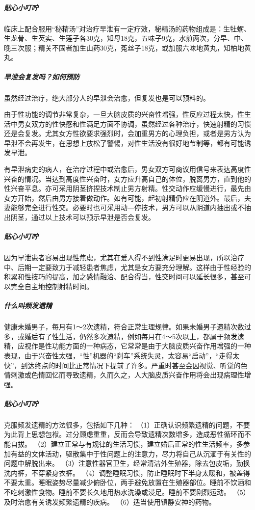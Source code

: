 \subparagraph{贴心小叮咛}

临床上配合服用“秘精汤”对治疗早泄有一定疗效，秘精汤的药物组成是：生牡蛎、生龙骨、生芡实、生莲子各30克，知母18克，五味子9克，水煎两次，分早、中、晚三次服；精关不固者加生山药30克，菟丝子18克，或加服六味地黄丸，知柏地黄丸。

\subparagraph{早泄会复发吗？如何预防}

虽然经过治疗，绝大部分人的早泄会治愈，但复发也是可以预料的。

由于性功能的调节非常复杂，一旦大脑皮质的兴奋性增强，性反应过程太快，性生活中男女双方的性快感和性满足方面不协调，虽然经过各种治疗，快速射精的习惯还是会复发。尤其女方性欲要求强烈时，会加重男方的心理负担，或者是男方认为早泄不会再发生，在思想上放松了警惕，对性生活没有很好地节制等，都有可能诱发早泄。

有早泄病史的病人，在治疗过程中或治愈后，男女双方可商议用信号来表达高度性兴奋的情况。当达到高度性兴奋时，女方应升高自己的体位，脱离男方，直到他的性兴奋平息。亦可采用阴茎挤捏技术制止男方射精。性交动作应缓慢进行，最先由女方开始，然后由男方接着做动作。如有可能，起初射精仍应在阴道外。最后，夫妻能够完全进行性交。必要时也可采用动—停技术，男方可以从阴道内抽出或不抽出阴茎，通过以上技术可以预示早泄是否会复发。

\subparagraph{贴心小叮咛}

因为早泄患者容易出现性焦虑，尤其在爱人得不到性满足时更易出现，所以治疗中、后期一定要致力于减轻患者焦虑，尤其是女方要充分理解。这样由于性经验的积累和性技巧的提高，加之感情融洽、配合得当，性交时间可以延长很多，甚至可以完全自主地控制射精时间。

\subparagraph{什么叫频发遗精}

健康未婚男子，每月有1～2次遗精，符合正常生理规律。如果未婚男子遗精次数过多，或婚后有了性生活，仍然多次遗精，例如每月在4～5次以上，都属于频发遗精，应视作是性功能方面的一种病态，它常常是由于大脑皮质兴奋作用增强的一种表现，由于兴奋性太强，“性”机器的“刹车”系统失灵，太容易“启动”，“走得太快”，到达终点的时间比正常情况下提前了许多。严重时甚至会因视觉、听觉的色情刺激或色情回忆而导致遗精，久而久之，人大脑皮质兴奋作用将会出现病理性增强。

\subparagraph{贴心小叮咛}

克服频发遗精的方法很多，包括如下几种：
（1）正确认识频繁遗精的问题，不要为此背上思想包袱。过分顾虑重重，反而会导致遗精次数增多，造成恶性循环而不能自拔。
（2）建立正常与有规律的生活习惯，建立婚后正常的性生活频率，多参加有益的文体活动，驱散集中于性问题上的注意力，尽力将自己从沉湎于有关性的问题中解脱出来。
（3）注意性器官卫生，经常清洁外生殖器，除去包皮垢，勤换洗内裤，不穿紧身衣裤。
（4）调整睡眠习惯，防止睡眠时下半身太暖和，被盖得不要太重。睡眠姿势尽量减少俯卧位，两手避免放置在生殖器部位。睡前不饮酒和不吃刺激性食物。睡前不要长久地用热水洗澡或浸足。睡前不要剧烈运动。
（5）及时治愈有关诱发频繁遗精的疾病。
（6）适当使用镇静安神的药物。

